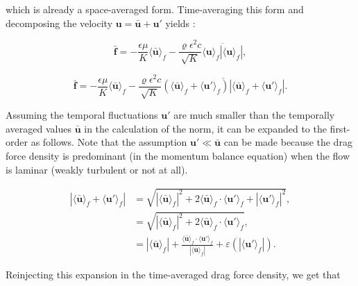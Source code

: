 \documentclass[a4paper,11pt]{article}
\begin{document}
which is already a space-averaged form.
Time-averaging this form and decomposing the velocity ${\bm u = \bm{\bar u} + \bm u'}$ yields \citep{G2000}:

$$\bm{\bar f} = -\frac{\epsilon\mu}{K}\langle\bm{\bar u}\rangle_f - \frac{\varrho\epsilon^2c}{\sqrt{K}}\overline{\langle\bm u\rangle_f\left|\langle\bm u\rangle_f\right|},$$

$$\bm{\bar f} = -\frac{\epsilon\mu}{K}\langle\bm{\bar u}\rangle_f - \frac{\varrho\epsilon^2c}{\sqrt{K}}\overline{\left(\langle\bm{\bar u}\rangle_f + \langle\bm u'\rangle_f\right)\left|\langle\bm{\bar u}\rangle_f + \langle\bm u'\rangle_f\right|}.$$

Assuming the temporal fluctuations $\bm u'$ are much smaller than the temporally averaged values $\bm{\bar u}$ in the calculation of the norm, it can be expanded to the first-order as follows.
Note that the assumption $\bm u'\ll\bm{\bar u}$ can be made because the drag force density is predominant (in the momentum balance equation) when the flow is laminar (weakly turbulent or not at all).

\begin{align*}
\left|\langle\bm{\bar u}\rangle_f+\langle \bm u'\rangle_f\right| & = \sqrt{\left|\langle\bm{\bar u}\rangle_f\right|^2+2\langle\bm{\bar u}\rangle_f\cdot\langle\bm u'\rangle_f+\left|\langle \bm u'\rangle_f\right|^2},\\
    & = \sqrt{\left|\langle\bm{\bar u}\rangle_f\right|^2+2\langle\bm{\bar u}\rangle_f\cdot\langle\bm u'\rangle_f},\\
    &= \left|\langle\bm{\bar u}\rangle_f\right|+\frac{\langle\bm{\bar u}\rangle_f\cdot\langle\bm u'\rangle_f}{\left|\langle\bm{\bar u}\rangle_f\right|} + \mathcal \varepsilon\left(\left|\langle\bm u'\rangle_f\right|\right).
\end{align*}

Reinjecting this expansion in the time-averaged drag force density, we get that
\end{document}

